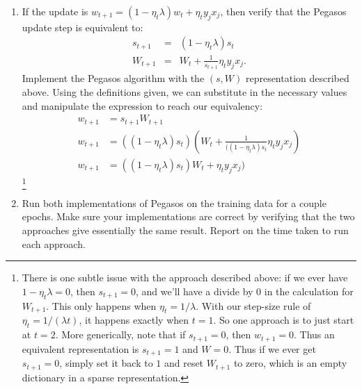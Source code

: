 \documentclass{article}
\theoremstyle{plain}
\theoremstyle{definition}
\begin{document}
\begin{enumerate}
  \setcounter{enumi}{\value{saveenum}}
\item 
If the update is $w_{t+1}=(1-\eta_{t}\lambda)w_{t}+\eta_{t}y_{j}x_{j}$,
then verify that the Pegasos update step is equivalent to:
\begin{eqnarray*}
s_{t+1} & = & \left(1-\eta_{t}\lambda\right)s_{t}\\
W_{t+1} & = & W_{t}+\frac{1}{s_{t+1}}\eta_{t}y_{j}x_{j}.
\end{eqnarray*}
Implement the Pegasos algorithm with the $(s,W)$ representation
described above. 
\subitem
Using the definitions given, we can substitute in the necessary values and manipulate the expression to reach our equivalency:
\begin{equation}
    \begin{split}
        w_{t+1} &= s_{t+1}W_{t+1} \\
        w_{t+1} &= ((1-\eta_t\lambda)s_t)(W_{t}+\frac{1}{((1-\eta_t\lambda)s_{t}}\eta_{t}y_{j}x_{j}) \\
        w_{t+1} &= ((1-\eta_t\lambda)s_t)W_t + \eta_{t}y_{j}x_{j})
    \end{split}
\end{equation}
\footnote{There is one subtle issue with the approach described above: if we
ever have $1-\eta_{t}\lambda=0$, then $s_{t+1}=0$, and we'll have
a divide by $0$ in the calculation for $W_{t+1}$. This only happens
when $\eta_{t}=1/\lambda$. With our step-size rule of $\eta_{t}=1/\left(\lambda t\right)$,
it happens exactly when $t=1$. So one approach is to just start at
$t=2$. More generically, note that if $s_{t+1}=0$, then $w_{t+1}=0$.
Thus an equivalent representation is $s_{t+1}=1$ and $W=0$. Thus
if we ever get $s_{t+1}=0$, simply set it back to $1$ and reset
$W_{t+1}$ to zero, which is an empty dictionary in a sparse representation.}



\item Run both implementations of Pegasos on the training data for a couple
epochs. Make sure your implementations are correct by verifying that the two
approaches give essentially the same result. Report on the time taken
to run each approach.\\



\end{enumerate}
\end{document}
